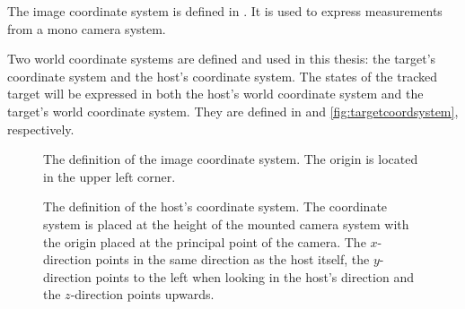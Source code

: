 \vspace{1em}

The image coordinate system is defined in .
It is used to \eg express measurements from a mono camera system.

Two world coordinate systems are defined and used in this thesis: the target's coordinate system and the host's coordinate system.
The states of the tracked target will be expressed in both the host's world coordinate system and the target's world coordinate system.
They are defined in  and \ref{fig:targetcoordsystem}, respectively.

\vspace{4em}

\begin{figure}[!ht]
	\centering
	\caption{\label{fig:imagecoordsystem} The definition of the image coordinate system. The origin is located in the upper left corner.}
\end{figure}

\vfill

\begin{figure}[!ht]
    \centering
    \caption{\label{fig:hostcoordsystem} The definition of the host's coordinate system. The coordinate system is placed at the height of the mounted camera system with the origin placed at the principal point of the camera. The $x$-direction points in the same direction as the host itself, the $y$-direction points to the left when looking in the host's direction and the $z$-direction points upwards.}
\end{figure}

